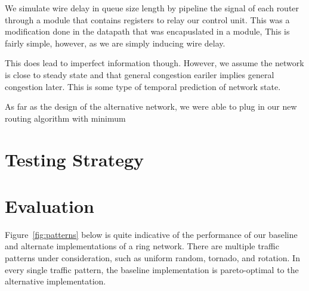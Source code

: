 \documentclass[10pt]{article}
\begin{document}
We simulate wire delay in queue size length by pipeline the signal of each 
router through a module that contains registers to relay our control unit. 
This was a modification done in the datapath that was encapuslated in a 
module, 
This is fairly simple, however, as we are simply inducing wire delay. \par
This does lead to imperfect information though.
However, we assume the network is close to steady state and that general 
congestion eariler implies general congestion later.
This is some type of temporal prediction of network state. \par

As far as the design of the alternative network, we were able to plug in our
new routing algorithm with minimum 

\section{Testing Strategy}

\section{Evaluation}

Figure~\ref{fig:patterns} below is quite indicative of the performance of
our baseline and alternate implementations of a ring network.
There are multiple traffic patterns under consideration, such as uniform 
random, tornado, and rotation. 
In every single traffic pattern, the baseline implementation is pareto-optimal
to the alternative implementation. \par
\end{document}

